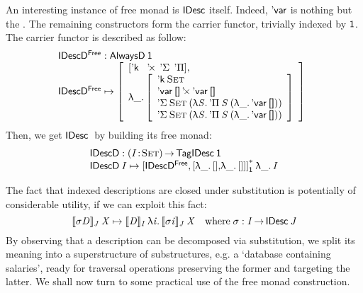 An interesting instance of free monad is $\SYMBIDesc$ itself. Indeed,
$\SYMBDVar$ is nothing but the \return. The remaining constructors form
the carrier functor, trivially indexed by $\Unit$. The carrier functor
is described as follow:
%
\[\stk{
\IDescFreeD : \ATagIDesc{\Unit} \\
\begin{array}{@{}ll}
\IDescFreeD \mapsto \bigRedBracket{\begin{array}{l}
                                \sqr{\SYMBDConst\:\:
                                     \DProd\:\:
                                     \SYMBDSigma\:\:
                                     \SYMBDPi} \red{,}\\
                                  \LAM{\_}\bigRedBracket{\begin{array}{l}
                                        \DConst{\Set}               \\
                                        \DProd{\DVar{\Void}}{\DVar{\Void}}  \\
                                        \DSigma{\Set}{(\LAM{\V{S}} \DPi{\V{S}}{(\LAM{\_} \DVar{\Void})})} \\
                                        \DSigma{\Set}{(\LAM{\V{S}} \DPi{\V{S}}{(\LAM{\_} \DVar{\Void})})}
                                    \end{array}}\end{array}}
\end{array}
}\]
%
Then, we get $\IDesc$ by building its free monad:
%
\[\stk{
\IDescD : \PI{\V{I}}{\Set} \TagIDesc{\Unit} \\
\IDescD\: \V{I} \mapsto \FreeIMonad{\red{[}\IDescFreeD\red{,[}\LAM{\_}\sqr{}\red{,}\LAM{\_}\red{[]]]}}{\Unit}\LAM{\_}\V{I}
}\]

The fact that indexed descriptions are closed under substitution
is potentially of considerable utility, if we can exploit this fact:
\[
\idescop{\V{\sigma} \V{D}}{\V{J}}{\V{X}} 
    \mapsto 
        \idescop{\V{D}}
                {\V{I}}
                {\LAM{\V{i}}
                     {\idescop{\V{\sigma} \V{i}}
                              {\V{J}}
                              {\V{X}}}}
        \quad \mbox{where}\;\V{\sigma}:\V{I}\To\IDesc{\V{J}}
\]
By observing that a description can be decomposed via substitution, we
split its meaning into a superstructure of substructures, e.g. a
`database containing salaries', ready for traversal operations
preserving the former and targeting the latter. We shall now turn to
some practical use of the free monad construction.
 
\newpage
